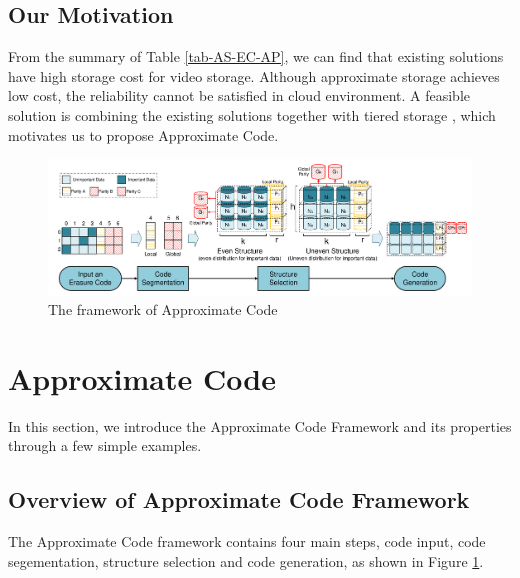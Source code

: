 \documentclass[sigconf]{acmart}
\begin{document}
\subsection{Our Motivation}


From the summary of Table \ref{tab-AS-EC-AP}, we can find that existing solutions have high storage cost for video storage. Although approximate storage achieves low cost, the reliability cannot be satisfied in cloud environment. A feasible solution is combining the existing solutions together with tiered storage \cite{krish2014hats} \cite{wang2014balancing} \cite{zhang2010automated} \cite{udipi2012lot}, which motivates us to propose Approximate Code.

\begin{figure}[ht!]
\centering
\includegraphics[width=0.9\linewidth]{photo/Framework-v3.pdf}
\caption{The framework of Approximate Code}
\label{fig-framework}
\end{figure}

\section{Approximate Code}\label{ApCode}
In this section, we introduce the Approximate Code Framework and its properties through a few simple examples.

\subsection{Overview of Approximate Code Framework}
The Approximate Code framework contains four main steps, code input, code segementation, structure selection and code generation, as shown in Figure \ref{fig-framework}.
\end{document}
